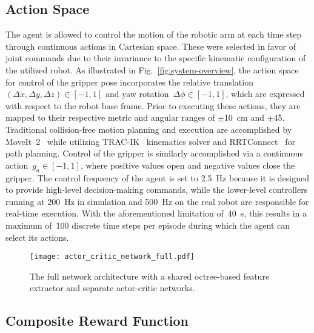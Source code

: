 \subsection{Action Space}\label{ssec:action-space}

The agent is allowed to control the motion of the robotic arm at each time step through continuous actions in Cartesian space. These were selected in favor of joint commands due to their invariance to the specific kinematic configuration of the utilized robot. As illustrated in Fig.~\ref{fig:system-overview}, the action space for control of the gripper pose incorporates the relative translation~\mbox{\((\Delta{x},\Delta{y},\Delta{z})\!\in\![-1,1]\)} and yaw rotation~\mbox{\(\Delta{\phi}\!\in\![-1,1]\)}, which are expressed with respect to the robot base frame. Prior to executing these actions, they are mapped to their respective metric and angular ranges of \(\pm\)10~cm and \(\pm\)45\textdegree. Traditional collision-free motion planning and execution are accomplished by MoveIt~2~\cite{moveit2} while utilizing \mbox{TRAC-IK}~\cite{beeson_trac-ik_2015} kinematics solver and \mbox{RRTConnect}~\cite{kuffner_rrt-connect_2000} for path planning. Control of the gripper is similarly accomplished via a continuous action~\mbox{\(g_{a}\!\in\![-1,1]\)}, where positive values open and negative values close the gripper. The control frequency of the agent is set to 2.5~Hz because it is designed to provide high-level decision-making commands, while the lower-level controllers running at 200~Hz in simulation and 500~Hz on the real robot are responsible for real-time execution. With the aforementioned limitation of~40~s, this results in a maximum of~100 discrete time steps per episode during which the agent can select its actions.

\begin{figure*}[thpb]
	\vspace{1.379mm}
	\centering
	\texttt{[image: actor\_critic\_network\_full.pdf]}
	\caption{The full network architecture with a shared octree-based feature extractor and separate actor-critic networks.}
	\label{fig:actor-critic-network}
\end{figure*}

\subsection{Composite Reward Function}\label{ssec:composite-reward-function}

